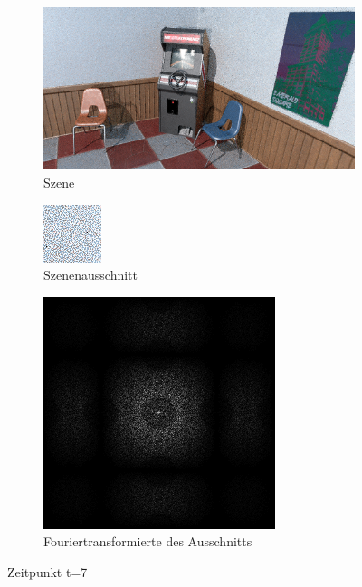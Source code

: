 \begin{figure}[H]
    \begin{subfigure}{\textwidth}   
        \centering \includegraphics[scale=.25]{content/TemporalerAlg/Bilder/Retargeting/Screenshots/seed_debug_9.0_selection.png}
        \caption{Szene}
        \label{fig:Retargeting_And_Sorting_Szene_t7}
    \end{subfigure}
    \begin{subfigure}{0.5\textwidth}
        \centering\includegraphics[width=0.4\linewidth]{content/TemporalerAlg/Bilder/Retargeting/Screenshots/seed_debug_9.0_ausschnitt.png} 
        \caption{Szenenausschnitt}
        \label{fig:Retargeting_And_Sorting_ausschnitt_t7}
    \end{subfigure}
    \begin{subfigure}{0.5\textwidth}
        \centering\includegraphics[width=0.4\linewidth]{content/TemporalerAlg/Bilder/Retargeting/Screenshots/Spektren/seed_debug_9.0_ausschnitt.png}
        \caption{Fouriertransformierte des Ausschnitts}
        \label{fig:Retargeting_And_Sorting_Fouriertransformierte_t7}
    \end{subfigure}
        \caption{Zeitpunkt t=7}
        \label{fig:Retargeting_And_Sorting_Verlauf_t7}
\end{figure}

